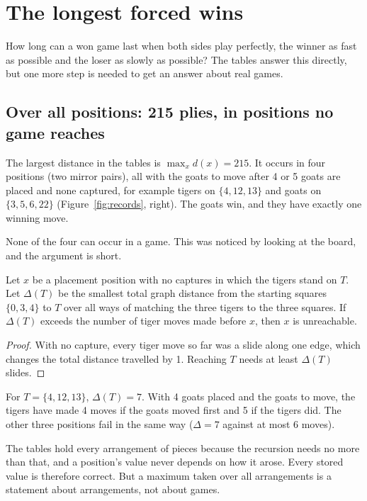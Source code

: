 \section{The longest forced wins}\label{sec:longest}

How long can a won game last when both sides play perfectly, the winner as fast as possible and the loser as
slowly as possible? The tables answer this directly, but one more step is needed to get an answer about
real games.

\subsection{Over all positions: 215 plies, in positions no game reaches}

The largest distance in the tables is $\max_x d(x) = 215$. It occurs in four positions (two mirror pairs),
all with the goats to move after 4 or 5 goats are placed and none captured, for example tigers on
$\{4, 12, 13\}$ and goats on $\{3, 5, 6, 22\}$ (Figure~\ref{fig:records}, right). The goats win, and they have
exactly one winning move.

None of the four can occur in a game. This was noticed by looking at the board, and the argument is short.

\begin{lemma}\label{lem:unreachable}
Let $x$ be a placement position with no captures in which the tigers stand on $T$. Let $\Delta(T)$ be the
smallest total graph distance from the starting squares $\{0, 3, 4\}$ to $T$ over all ways of matching the
three tigers to the three squares. If $\Delta(T)$ exceeds the number of tiger moves made before $x$, then $x$
is unreachable.
\end{lemma}

\begin{proof}
With no capture, every tiger move so far was a slide along one edge, which changes the total distance
travelled by 1. Reaching $T$ needs at least $\Delta(T)$ slides.
\end{proof}

For $T = \{4, 12, 13\}$, $\Delta(T) = 7$. With 4 goats placed and the goats to move, the tigers have made 4
moves if the goats moved first and 5 if the tigers did. The other three positions fail in the same way
($\Delta = 7$ against at most 6 moves).

The tables hold every arrangement of pieces because the recursion needs no more than that, and a position's
value never depends on how it arose. Every stored value is therefore correct. But a maximum taken over all
arrangements is a statement about arrangements, not about games.

